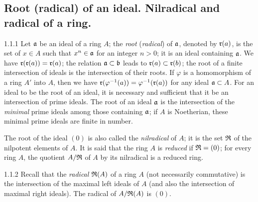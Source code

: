 \documentclass[../main.tex]{subfiles}
\begin{document}
\subsection{Root (radical) of an ideal. Nilradical and radical of a ring.}

\begin{cx}{1.1.1}
Let $\mathfrak{a}$ be an ideal of a ring $A$; the \emph{root} (\emph{radical}) of $\mathfrak{a}$, denoted
by $\mathfrak{r}(a)$, is the set of $x\in A$ such that $x^n\in\mathfrak{a}$ for an integer $n>0$; it is an
ideal containing $\mathfrak{a}$. We have $\mathfrak{r}(\mathfrak{r}(a))=\mathfrak{r}(a)$; the relation $\mathfrak{a}\subset\mathfrak{b}$
leads to $\mathfrak{r}(a)\subset\mathfrak{r}(b)$; the root of a finite intersection of ideals is the
intersection of their roots. If $\varphi$  is a homomorphism of a ring $A'$ into $A$, then we
have $\mathfrak{r}(\varphi^{-1}(a))=\varphi^{-1}(\mathfrak{r}(a))$
for any ideal $\mathfrak{a}\subset A$. For an ideal to be the root of an ideal,
it is necessary and sufficient that it be an intersection of prime ideals. The root of an
ideal $\mathfrak{a}$ is the intersection of the
\emph{minimal} prime ideals among those containing $\mathfrak{a}$; if $A$ is
Noetherian, these minimal prime ideals are finite in number.

The root of the ideal $(0)$ is also called the \emph{nilradical} of $A$; it is the set
$\mathfrak{R}$ of the nilpotent elements of $A$. It is said that the ring $A$ is \emph{reduced} if
$\mathfrak{R}=(0)$; for every ring $A$, the quotient $A/\mathfrak{R}$ of $A$ by its nilradical is a
reduced ring.
\end{cx}

\begin{cx}{1.1.2}
Recall that the \emph{radical} $\mathfrak{R}(A)$ of a ring $A$ (not necessarily commutative) is the
intersection of the maximal left ideals of $A$ (and also the intersection of maximal
right ideals). The radical of $A/\mathfrak{R}(A)$ is $(0)$.
\end{cx}
\end{document}
